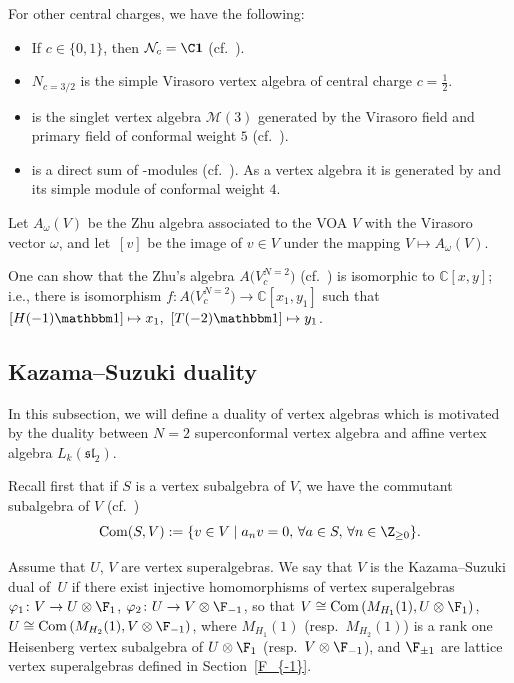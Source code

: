  For other central charges, we have the following:
\begin{itemize}\itemsep=0pt
\item If $c\in \{ 0, 1\}$, then $\mathcal N_c = {\C} {\bf 1}$ (cf.\ \cite{DLY}).
\item $N_{c=3/2}$ is the simple Virasoro vertex algebra of central charge $c=\frac{1}{2}$.
 \item {} is the singlet vertex algebra $\mathcal M(3)$ generated by the Virasoro field and primary field of conformal weight $5$ (cf.\ \cite{A-2005}).
 \item {} is a direct sum of -modules (cf.\ \cite{AMW}). As a vertex algebra it is generated by  and its simple module of conformal weight $4$.
\end{itemize}

 Let $A_{\omega}(V)$ be the Zhu algebra associated to the VOA $V$ with the Virasoro vector $\omega$, and let~$[v]$ be the image of $v \in V $ under the mapping $V \mapsto A_{\omega}(V)$.

 One can show that the Zhu's algebra $A\bigl(V^{N=2}_{c}\bigr)$ (cf.\ \cite{A-IMRN}) is isomorphic to ${\mathbb C}[x,y]$; i.e., there is isomorphism $f \colon A\bigl(V^{N=2}_{c}\bigr) \rightarrow {\mathbb C}[x_1,y_1]$ such that
$[H({-1}){\mathbbm 1}] \mapsto x_1, \ [T({-2}{)\mathbbm 1}] \mapsto y_1$.

\subsection{Kazama--Suzuki duality}
In this subsection, we will define a duality of vertex algebras which is motivated by the duality between $N=2$ superconformal vertex algebra and affine vertex algebra $L_k(\mathfrak{sl}_2)$.

Recall first that if $S$ is a vertex subalgebra of $V$, we have the commutant subalgebra of $V$ (cf.\ \cite{LL})
\[
\operatorname{Com} (S, V):= \{ v \in V \mid a_n v = 0,\, \forall a \in S,\, \forall n \in {\Z}_{\ge 0}\}.
\]

Assume that $U$, $V$ are vertex superalgebras. We say that $V$ is the Kazama--Suzuki dual of~$U$ if there exist injective homomorphisms of vertex superalgebras
$
 \varphi_1 \colon V \rightarrow U \otimes \F_1$, $ \varphi_2 \colon U \rightarrow V \otimes \F_{-1}$,
so that
$
V \cong \operatorname{Com} \left( M_{H_1} (1), U \otimes \F_1\right)$, $ U \cong \operatorname{Com} \left( M_{H_2} (1), V \otimes \F_{-1}\right)$,
where $M_{H_1} (1) $ (resp.\ $ M_{H_2} (1)$) is a rank one Heisenberg vertex subalgebra of
$U\otimes \F_1$ (resp.\ $V\otimes \F_{-1}$), and $\F_{\pm 1}$ are lattice vertex superalgebras defined in Section~\ref{F_{-1}}.

